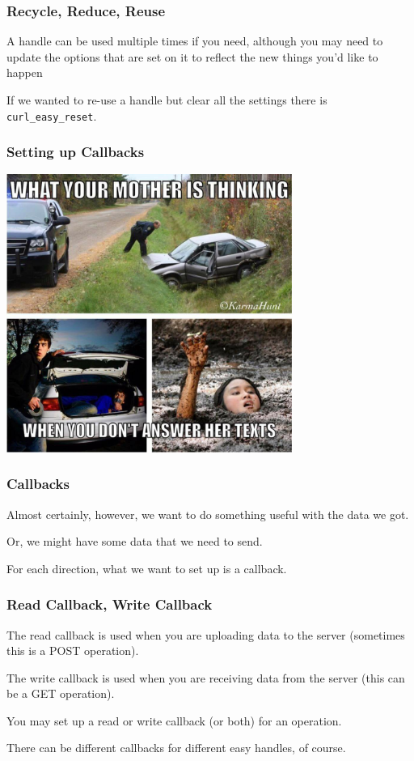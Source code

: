 \begin{frame}
	\frametitle{Recycle, Reduce, Reuse}

	A handle can be used multiple times if you need, although you may need to update the options that are set on it to reflect the new things you'd like to happen

	If we wanted to re-use a handle but clear all the settings there is \texttt{curl\_easy\_reset}.

\end{frame}



\begin{frame}
	\frametitle{Setting up Callbacks}

	\begin{center}
		\includegraphics[width=0.7\textwidth]{images/callbacks.jpg}
	\end{center}

\end{frame}



\begin{frame}
	\frametitle{Callbacks}

	Almost certainly, however, we want to do something useful with the data we got.

	Or, we might have some data that we need to send.

	For each direction, what we want to set up is a \alert{callback}.


\end{frame}



\begin{frame}
	\frametitle{Read Callback, Write Callback}

	The read callback is used when you are uploading data to the server (sometimes this is a POST operation).

	The write callback is used when you are receiving data from the server (this can be a GET operation).

	You may set up a read or write callback (or both) for an operation.

	There can be different callbacks for different easy handles, of course.

\end{frame}



